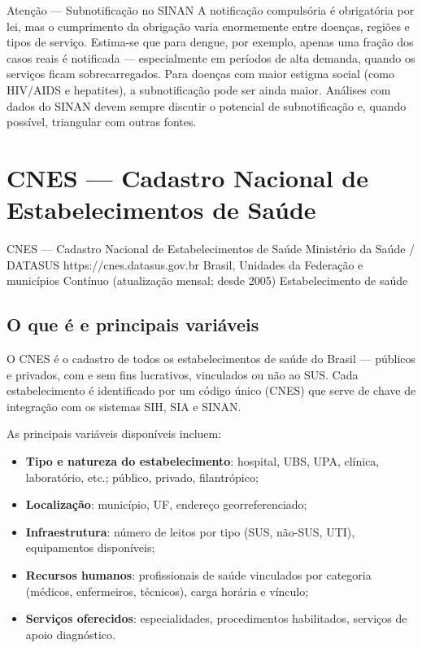 \begin{boxatencao}{Atenção --- Subnotificação no SINAN}
A notificação compulsória é obrigatória por lei, mas o cumprimento da obrigação varia enormemente entre doenças, regiões e tipos de serviço. Estima-se que para dengue, por exemplo, apenas uma fração dos casos reais é notificada --- especialmente em períodos de alta demanda, quando os serviços ficam sobrecarregados. Para doenças com maior estigma social (como HIV/AIDS e hepatites), a subnotificação pode ser ainda maior. Análises com dados do SINAN devem sempre discutir o potencial de subnotificação e, quando possível, triangular com outras fontes.
\end{boxatencao}

\section{CNES --- Cadastro Nacional de Estabelecimentos de Saúde}

\ficharapida
  {CNES --- Cadastro Nacional de Estabelecimentos de Saúde}
  {Ministério da Saúde / DATASUS}
  {https://cnes.datasus.gov.br}
  {Brasil, Unidades da Federação e municípios}
  {Contínuo (atualização mensal; desde 2005)}
  {Estabelecimento de saúde}

\subsection{O que é e principais variáveis}

O CNES é o cadastro de todos os estabelecimentos de saúde do Brasil --- públicos e privados, com e sem fins lucrativos, vinculados ou não ao SUS. Cada estabelecimento é identificado por um código único (CNES) que serve de chave de integração com os sistemas SIH, SIA e SINAN.

As principais variáveis disponíveis incluem:

\begin{itemize}
  \item \textbf{Tipo e natureza do estabelecimento}: hospital, UBS, UPA, clínica, laboratório, etc.; público, privado, filantrópico;
  \item \textbf{Localização}: município, UF, endereço georreferenciado;
  \item \textbf{Infraestrutura}: número de leitos por tipo (SUS, não-SUS, UTI), equipamentos disponíveis;
  \item \textbf{Recursos humanos}: profissionais de saúde vinculados por categoria (médicos, enfermeiros, técnicos), carga horária e vínculo;
  \item \textbf{Serviços oferecidos}: especialidades, procedimentos habilitados, serviços de apoio diagnóstico.
\end{itemize}

